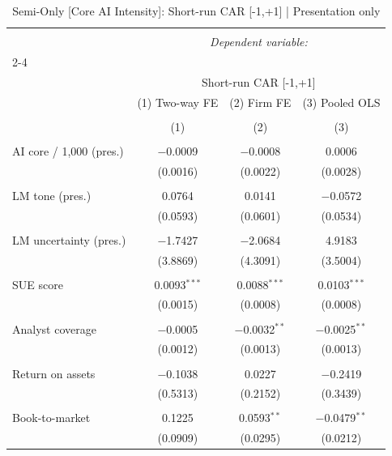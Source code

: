 
\begin{table}[!htbp] \centering 
  \caption{Semi-Only [Core AI Intensity]: Short-run CAR [-1,+1]  |  Presentation only} 
  \label{} 
\begin{tabular}{@{\extracolsep{5pt}}lccc} 
\\[-1.8ex]\hline 
\hline \\[-1.8ex] 
 & \multicolumn{3}{c}{\textit{Dependent variable:}} \\ 
\cline{2-4} 
\\[-1.8ex] & \multicolumn{3}{c}{Short-run CAR [-1,+1]} \\ 
 & (1) Two-way FE & (2) Firm FE & (3) Pooled OLS \\ 
\\[-1.8ex] & (1) & (2) & (3)\\ 
\hline \\[-1.8ex] 
 AI core / 1,000 (pres.) & $-$0.0009 & $-$0.0008 & 0.0006 \\ 
  & (0.0016) & (0.0022) & (0.0028) \\ 
  & & & \\ 
 LM tone (pres.) & 0.0764 & 0.0141 & $-$0.0572 \\ 
  & (0.0593) & (0.0601) & (0.0534) \\ 
  & & & \\ 
 LM uncertainty (pres.) & $-$1.7427 & $-$2.0684 & 4.9183 \\ 
  & (3.8869) & (4.3091) & (3.5004) \\ 
  & & & \\ 
 SUE score & 0.0093$^{***}$ & 0.0088$^{***}$ & 0.0103$^{***}$ \\ 
  & (0.0015) & (0.0008) & (0.0008) \\ 
  & & & \\ 
 Analyst coverage & $-$0.0005 & $-$0.0032$^{**}$ & $-$0.0025$^{**}$ \\ 
  & (0.0012) & (0.0013) & (0.0013) \\ 
  & & & \\ 
 Return on assets & $-$0.1038 & 0.0227 & $-$0.2419 \\ 
  & (0.5313) & (0.2152) & (0.3439) \\ 
  & & & \\ 
 Book-to-market & 0.1225 & 0.0593$^{**}$ & $-$0.0479$^{**}$ \\ 
  & (0.0909) & (0.0295) & (0.0212) \\ 

\end{tabular}
\end{table}
